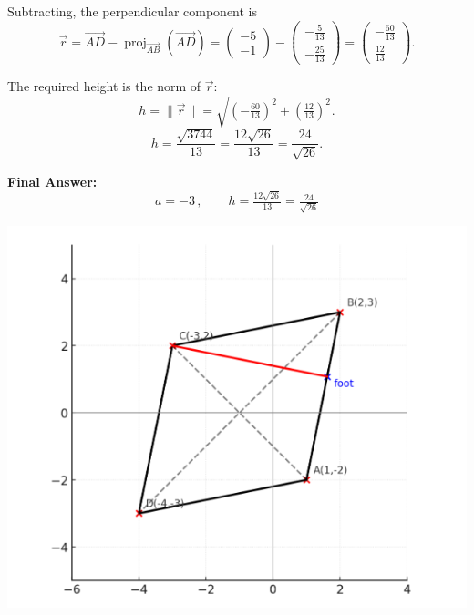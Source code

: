 \documentclass[journal]{IEEEtran}
\begin{document}
Subtracting, the perpendicular component is
\begin{equation}
\vec r=\vec{AD}-\operatorname{proj}_{\vec{AB}}(\vec{AD})
=\begin{pmatrix}-5\\-1\end{pmatrix}
-\begin{pmatrix}-\tfrac{5}{13}\\[4pt]-\tfrac{25}{13}\end{pmatrix}
=\begin{pmatrix}-\tfrac{60}{13}\\[4pt]\tfrac{12}{13}\end{pmatrix}.
\end{equation}

The required height is the norm of $\vec r$:
\begin{equation}
h=\|\vec r\|
=\sqrt{\left(-\tfrac{60}{13}\right)^2+\left(\tfrac{12}{13}\right)^2}.
\end{equation}
\begin{equation}
h=\frac{\sqrt{3744}}{13}
=\frac{12\sqrt{26}}{13}
=\frac{24}{\sqrt{26}}.
\end{equation}

\bigskip

\noindent
\textbf{Final Answer:}
\begin{equation}
\boxed{\,a=-3\,,\qquad h=\tfrac{12\sqrt{26}}{13}=\tfrac{24}{\sqrt{26}}\,}
\end{equation}
\bigskip

\begin{center}
    \includegraphics[width=0.8\columnwidth]{figs/fig4.png}
\end{center}
\end{document}
